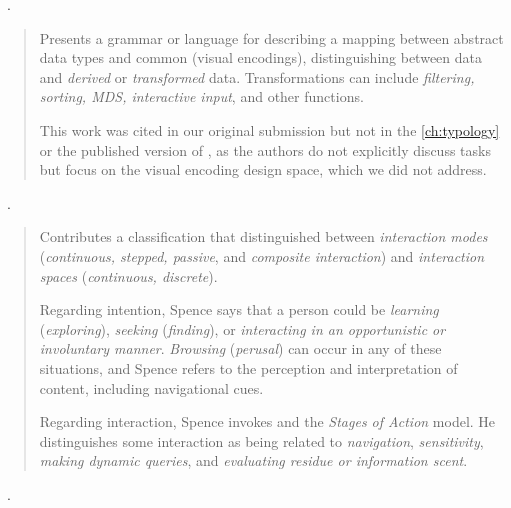 \begin{sloppypar}
~\cite{Card1997}. \end{sloppypar}

\begin{quotation}
    Presents a grammar or language for describing a mapping between abstract data types and common (visual encodings), distinguishing between data and {\it derived} or {\it transformed} data.
    Transformations can include {\it filtering, sorting, \ac{MDS}, interactive input}, and other functions.
    
    This work was cited in our original submission but not in the  \autoref{ch:typology} or the published version of \citet{Brehmer2013}, as the authors do not explicitly discuss tasks but focus on the visual encoding design space, which we did not address.
\end{quotation}

\begin{sloppypar}
~\cite{Spence2007}. \end{sloppypar}

\begin{quotation}
    Contributes a classification that distinguished between {\it interaction modes} ({\it continuous, stepped, passive}, and {\it composite interaction}) and {\it interaction spaces} ({\it continuous, discrete}).

    Regarding intention, Spence says that a person could be {\it learning} ({\it exploring}), {\it seeking} ({\it finding}), or {\it interacting in an opportunistic or involuntary manner}. 
    {\it Browsing} ({\it perusal}) can occur in any of these situations, and Spence refers to the perception and interpretation of content, including navigational cues.
    
    Regarding interaction, Spence invokes \citet{Norman1988} and the {\it Stages of Action} model.
    He distinguishes some interaction as being related to {\it navigation}, {\it sensitivity}, {\it making dynamic queries}, and {\it evaluating residue or information scent}.
\end{quotation}

\begin{sloppypar}
~\cite{Friel2001}. \end{sloppypar}

